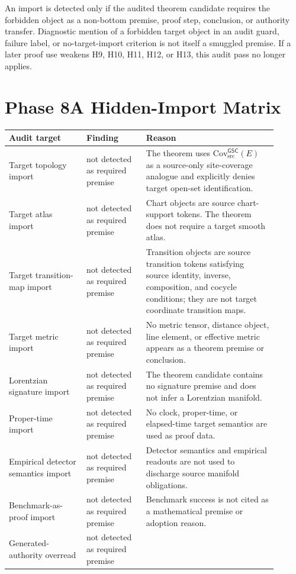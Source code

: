 \documentclass[11pt]{article}
\newcommand{\CovSrc}{\mathrm{Cov}_{\mathrm{src}}^{\mathsf{GSC}}}
\begin{document}
An import is detected only if the audited theorem candidate requires the
forbidden object as a non-bottom premise, proof step, conclusion, or authority
transfer. Diagnostic mention of a forbidden target object in an audit guard,
failure label, or no-target-import criterion is not itself a smuggled premise.
If a later proof use weakens H9, H10, H11, H12, or H13, this audit pass no
longer applies.

\section{Phase 8A Hidden-Import Matrix}

\begin{longtable}{p{0.26\linewidth}p{0.20\linewidth}p{0.44\linewidth}}
\toprule
Audit target & Finding & Reason \\
\midrule
Target topology import & not detected as required premise &
The theorem uses \(\CovSrc(E)\) as a source-only site-coverage analogue and
explicitly denies target open-set identification. \\
Target atlas import & not detected as required premise &
Chart objects are source chart-support tokens. The theorem does not require a
target smooth atlas. \\
Target transition-map import & not detected as required premise &
Transition objects are source transition tokens satisfying source identity,
inverse, composition, and cocycle conditions; they are not target coordinate
transition maps. \\
Target metric import & not detected as required premise &
No metric tensor, distance object, line element, or effective metric appears as
a theorem premise or conclusion. \\
Lorentzian signature import & not detected as required premise &
The theorem candidate contains no signature premise and does not infer a
Lorentzian manifold. \\
Proper-time import & not detected as required premise &
No clock, proper-time, or elapsed-time target semantics are used as proof data. \\
Empirical detector semantics import & not detected as required premise &
Detector semantics and empirical readouts are not used to discharge source
manifold obligations. \\
Benchmark-as-proof import & not detected as required premise &
Benchmark success is not cited as a mathematical premise or adoption reason. \\
Generated-authority overread & not detected as required premise &

\end{longtable}
\end{document}
